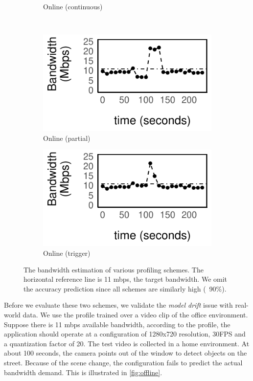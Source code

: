 \begin{figure}
\begin{subfigure}[t]{0.48\columnwidth}
    \caption{Online (continuous)}
    \label{fig:online}
  \end{subfigure}
  \\
  \vspace{1.5em}
  \begin{subfigure}[t]{0.48\columnwidth}
    \includegraphics[width=\textwidth]{figures/online3.pdf}
    \caption{Online (partial)}
    \label{fig:online-partial}
  \end{subfigure}
  \hfill
  \begin{subfigure}[t]{0.48\columnwidth}
    \includegraphics[width=\textwidth]{figures/online4.pdf}
    \caption{Online (trigger)}
    \label{fig:online-trigger}
  \end{subfigure}
  \caption{The bandwidth estimation of various profiling schemes. The horizontal
    reference line is 11 mbps, the target bandwidth. We omit the accuracy
    prediction since all schemes are similarly high (~90\%).}
  \label{fig:online-tricks}
\end{figure}

 Before we evaluate these two
schemes, we validate the \textit{model drift} issue with real-world data. We use
the profile trained over a video clip of the office environment. Suppose there
is 11 mbps available bandwidth, according to the profile, the application should
operate at a configuration of 1280x720 resolution, 30FPS and a quantization
factor of 20. The test video is collected in a home environment. At about 100
seconds, the camera points out of the window to detect objects on the street.
Because of the scene change, the configuration fails to predict the actual
bandwidth demand. This is illustrated in \autoref{fig:offline}.

